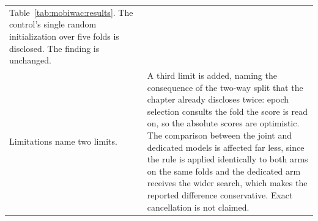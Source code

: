\begin{table}[htb]
\begin{tabular}{@{}p{}p{}@{}}
Table~\ref{tab:mobiwac:results}. The control's single random initialization over five
folds is disclosed. The finding is unchanged. \\
\addlinespace
Limitations name two limits. &
A third limit is added, naming the consequence of the two-way split that the chapter
already discloses twice: epoch selection consults the fold the score is read on, so the
absolute scores are optimistic. The comparison between the joint and dedicated models is
affected far less, since the rule is applied identically to both arms on the same folds
and the dedicated arm receives the wider search, which makes the reported difference
conservative. Exact cancellation is not claimed. \\
\bottomrule
\end{tabular}
\end{table}
